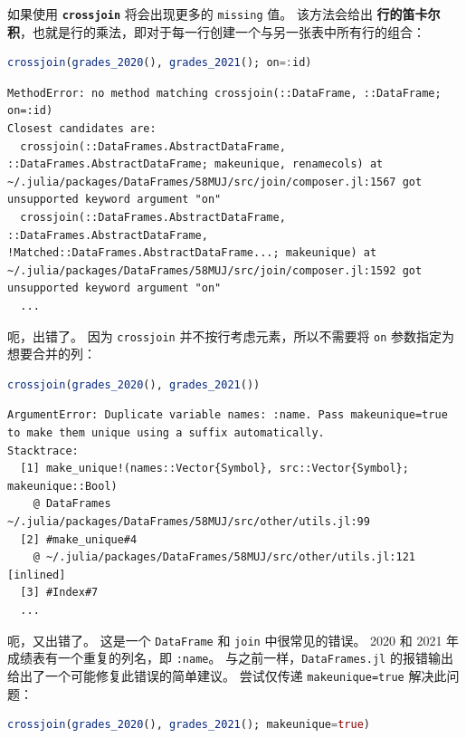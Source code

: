 \documentclass[
  notoc %
]{tufte-book}
\newcommand{\passthrough}[1]{#1}
\begin{document}
如果使用 \textbf{\passthrough{\lstinline!crossjoin!}} 将会出现更多的
\passthrough{\lstinline!missing!} 值。 该方法会给出
\textbf{行的笛卡尔积}，也就是行的乘法，即对于每一行创建一个与另一张表中所有行的组合：

\begin{lstlisting}[language=Julia]
crossjoin(grades_2020(), grades_2021(); on=:id)
\end{lstlisting}

\begin{lstlisting}[language=Output]
MethodError: no method matching crossjoin(::DataFrame, ::DataFrame; on=:id)
Closest candidates are:
  crossjoin(::DataFrames.AbstractDataFrame, ::DataFrames.AbstractDataFrame; makeunique, renamecols) at ~/.julia/packages/DataFrames/58MUJ/src/join/composer.jl:1567 got unsupported keyword argument "on"
  crossjoin(::DataFrames.AbstractDataFrame, ::DataFrames.AbstractDataFrame, !Matched::DataFrames.AbstractDataFrame...; makeunique) at ~/.julia/packages/DataFrames/58MUJ/src/join/composer.jl:1592 got unsupported keyword argument "on"
  ...
\end{lstlisting}

呃，出错了。 因为 \passthrough{\lstinline!crossjoin!}
并不按行考虑元素，所以不需要将 \passthrough{\lstinline!on!}
参数指定为想要合并的列：

\begin{lstlisting}[language=Julia]
crossjoin(grades_2020(), grades_2021())
\end{lstlisting}

\begin{lstlisting}[language=Output]
ArgumentError: Duplicate variable names: :name. Pass makeunique=true to make them unique using a suffix automatically.
Stacktrace:
  [1] make_unique!(names::Vector{Symbol}, src::Vector{Symbol}; makeunique::Bool)
    @ DataFrames ~/.julia/packages/DataFrames/58MUJ/src/other/utils.jl:99
  [2] #make_unique#4
    @ ~/.julia/packages/DataFrames/58MUJ/src/other/utils.jl:121 [inlined]
  [3] #Index#7
  ...
\end{lstlisting}

呃，又出错了。 这是一个 \passthrough{\lstinline!DataFrame!} 和
\passthrough{\lstinline!join!} 中很常见的错误。 2020 和 2021
年成绩表有一个重复的列名，即 \passthrough{\lstinline!:name!}。
与之前一样，\passthrough{\lstinline!DataFrames.jl!}
的报错输出给出了一个可能修复此错误的简单建议。 尝试仅传递
\passthrough{\lstinline!makeunique=true!} 解决此问题：

\begin{lstlisting}[language=Julia]
crossjoin(grades_2020(), grades_2021(); makeunique=true)
\end{lstlisting}
\end{document}
